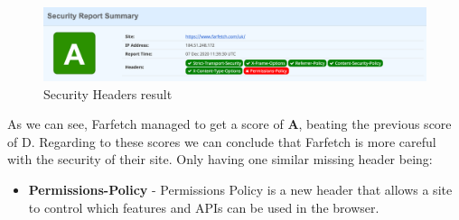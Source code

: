 \begin{figure}[ht!]
 	\centering
 	\includegraphics[width=1\linewidth]{img/securityheaders2.png}
 	\caption{Security Headers result}
\end{figure}

As we can see, Farfetch managed to get a score of \textbf{A}, beating the previous score of D. Regarding to these scores we can conclude that Farfetch is more careful with the security of their site. Only having one similar missing header being:

\begin{itemize}
    \item \textbf{Permissions-Policy} - Permissions Policy is a new header that allows a site to control which features and APIs can be used in the browser.
\end{itemize}

\pagebreak